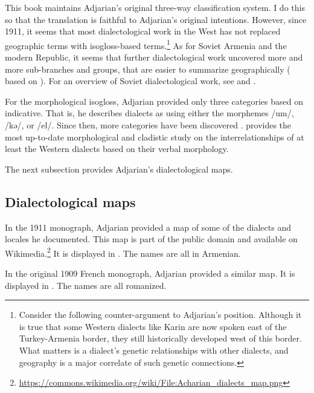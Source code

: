 \documentclass[output=paper]{langscibook}
\begin{document}
This book maintains Adjarian's original three-way classification system. I do this so that the translation is faithful to Adjarian's original intentions. However, since 1911, it seems that most dialectological work in the West has not replaced geographic terms with isogloss-based terms.\footnote{Consider the following counter-argument to Adjarian's position.  Although it is true that some Western dialects like Karin are now spoken east of the Turkey-Armenia border, they still historically developed west of this border. What matters is a dialect's genetic relationships with other dialects, and geography is a major correlate of such genetic connections.} As for Soviet Armenia and the modern Republic, it seems that further dialectological work uncovered more and more sub-branches and groups, that are easier to summarize geographically (\citealt[\S 4]{Martirosyan-2019-Armeniandialects} based on \citealt{Jahukyan-1972-ArmenianDiaolectology}). For an overview of Soviet dialectological work, see \citet{Djahukian-1986-IntroductionToDialectology} and \citet{Weitenberg-2017-DialectologyArmenian}.

For the morphological isogloss, Adjarian provided only three categories based on indicative. That is, he describes dialects as using either the morphemes /um/, /kə/, or /el/. Since then, more categories have been discovered \citep{Vaux-1995-ArmenianVerbDiachrony}. \citet{Balabanian-2024-ThesisDiachronicanalysisWesternArmenianverbalmorphology} provides the most up-to-date morphological and cladistic study on the interrelationships of at least the Western dialects based on their verbal morphology.

The next subsection provides Adjarian's dialectological maps.

\subsection{Dialectological maps}\label{section:HossepIntro:maps}


In the 1911 monograph, Adjarian provided a map of some of the dialects and locales he documented. This map is part of the public domain and available on Wikimedia.\footnote{\url{https://commons.wikimedia.org/wiki/File:Acharian_dialects_map.png}} It is displayed in . The names are all in Armenian. 

In the original 1909 French monograph, Adjarian provided a similar map. It   is displayed in . The names are all romanized. 
\end{document}
